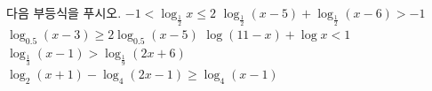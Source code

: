 다음 부등식을 푸시오.
 $-1<\log_{\frac{1}{2}} x\le 2$
 $\log_{\frac{1}{2}} (x-5)+\log_{\frac{1}{2}} (x-6)>-1$
 $\log_{0.5} (x-3)\ge 2\log_{0.5} (x-5)$
 $\log (11-x)+\log x<1$
 $\log_{\frac{1}{3}} (x-1)>\log_{\frac{1}{9}} (2x+6)$
 $\log_2 (x+1)-\log_4 (2x-1)\ge\log_4 (x-1)$

